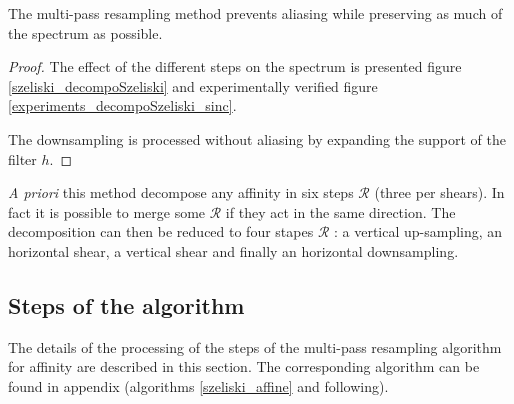 	\begin{thm}
	The multi-pass resampling method \cite{szeliski2010high} prevents aliasing while preserving as much of the spectrum as possible. %
	\end{thm}
	\begin{proof}
	The effect of the different steps on the spectrum is presented figure \ref{szeliski_decompoSzeliski} and experimentally verified figure \ref{experiments_decompoSzeliski_sinc}.
	
	The downsampling is processed without aliasing by expanding the support of the filter $h$.
	\end{proof}
	
	
	
	\emph{A priori} this method decompose any affinity in six steps $\mathcal R$ (three per shears). In fact it is possible to merge some $\mathcal R$ if they act in the same direction. The decomposition can then be reduced to four stapes $\mathcal R$ : a vertical up-sampling, an horizontal shear, a vertical shear and finally an horizontal downsampling.
	
	
\subsection{Steps of the algorithm}
	\label{szeliski_affine_section}
	
	The details of the processing of the steps of the multi-pass resampling algorithm for affinity are described in this section. The corresponding algorithm can be found in appendix (algorithms \ref{szeliski_affine} and following).
	
